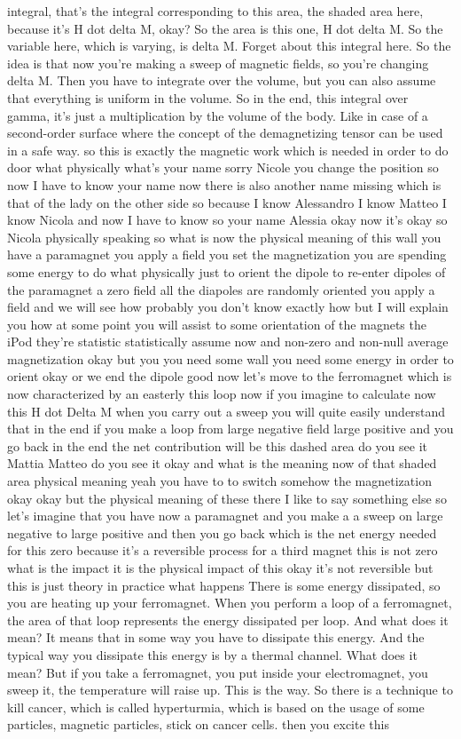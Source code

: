 integral, that's the integral corresponding to this area, the shaded area here, because it's H dot delta M, okay? So the area is this one, H dot delta M. So the variable here, which is varying, is delta M. Forget about this integral here. So the idea is that now you're making a sweep of magnetic fields, so you're changing delta M. Then you have to integrate over the volume, but you can also assume that everything is uniform in the volume. So in the end, this integral over gamma, it's just a multiplication by the volume of the body. Like in case of a second-order surface where the concept of the demagnetizing tensor can be used in a safe way. so this is exactly the magnetic work which is needed in order to do door what physically what's your name sorry Nicole you change the position so now I have to know your name now there is also another name missing which is that of the lady on the other side so because I know Alessandro I know Matteo I know Nicola and now I have to know so your name Alessia okay now it's okay so Nicola physically speaking so what is now the physical meaning of this wall you have a paramagnet you apply a field you set the magnetization you are spending some energy to do what physically just to orient the dipole to re-enter dipoles of the paramagnet a zero field all the diapoles are randomly oriented you apply a field and we will see how probably you don't know exactly how but I will explain you how at some point you will assist to some orientation of the magnets the iPod they're statistic statistically assume now and non-zero and non-null average magnetization okay but you you need some wall you need some energy in order to orient okay or we end the dipole good now let's move to the ferromagnet which is now characterized by an easterly this loop now if you imagine to calculate now this H dot Delta M when you carry out a sweep you will quite easily understand that in the end if you make a loop from large negative field large positive and you go back in the end the net contribution will be this dashed area do you see it Mattia Matteo do you see it okay and what is the meaning now of that shaded area physical meaning yeah you have to to switch somehow the magnetization okay okay but the physical meaning of these there I like to say something else so let's imagine that you have now a paramagnet and you make a a sweep on large negative to large positive and then you go back which is the net energy needed for this zero because it's a reversible process for a third magnet this is not zero what is the impact it is the physical impact of this okay it's not reversible but this is just theory in practice what happens There is some energy dissipated, so you are heating up your ferromagnet. When you perform a loop of a ferromagnet, the area of that loop represents the energy dissipated per loop. And what does it mean? It means that in some way you have to dissipate this energy. And the typical way you dissipate this energy is by a thermal channel. What does it mean? But if you take a ferromagnet, you put inside your electromagnet, you sweep it, the temperature will raise up. This is the way. So there is a technique to kill cancer, which is called hyperturmia, which is based on the usage of some particles, magnetic particles, stick on cancer cells. then you excite this 